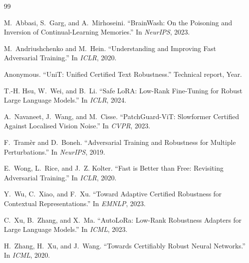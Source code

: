 \documentclass{article}
\begin{document}
\begin{thebibliography}{99}

M.~Abbasi, S.~Garg, and A.~Mirhoseini.  
\newblock ``BrainWash: On the Poisoning and Inversion of Continual-Learning Memories.''  
\newblock In \emph{NeurIPS}, 2023.

M.~Andriushchenko and M.~Hein.  
\newblock ``Understanding and Improving Fast Adversarial Training.''  
\newblock In \emph{ICLR}, 2020.

Anonymous.  
\newblock ``UniT: Unified Certified Text Robustness.''  
\newblock Technical report, Year.

T.-H. Hsu, W.~Wei, and B.~Li.  
\newblock ``Safe LoRA: Low-Rank Fine-Tuning for Robust Large Language Models.''  
\newblock In \emph{ICLR}, 2024.

A.~Navaneet, J.~Wang, and M.~Cisse.  
\newblock ``PatchGuard-ViT: Slowformer Certified Against Localised Vision Noise.''  
\newblock In \emph{CVPR}, 2023.

F.~Tramèr and D.~Boneh.  
\newblock ``Adversarial Training and Robustness for Multiple Perturbations.''  
\newblock In \emph{NeurIPS}, 2019.

E.~Wong, L.~Rice, and J.~Z. Kolter.  
\newblock ``Fast is Better than Free: Revisiting Adversarial Training.''  
\newblock In \emph{ICLR}, 2020.

Y.~Wu, C.~Xiao, and F.~Xu.  
\newblock ``Toward Adaptive Certified Robustness for Contextual Representations.''  
\newblock In \emph{EMNLP}, 2023.

C.~Xu, B.~Zhang, and X.~Ma.  
\newblock ``AutoLoRa: Low-Rank Robustness Adapters for Large Language Models.''  
\newblock In \emph{ICML}, 2023.

H.~Zhang, H.~Xu, and J.~Wang.  
\newblock ``Towards Certifiably Robust Neural Networks.''  
\newblock In \emph{ICML}, 2020.

\end{thebibliography}
\end{document}

